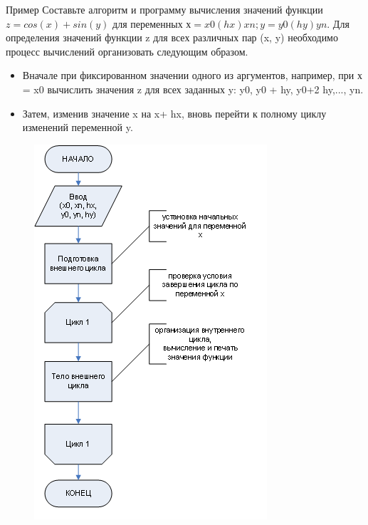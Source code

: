 \documentclass{beamer}
\begin{document}
\begin{frame}{Пример}
Составьте алгоритм и программу вычисления значений функции $z = cos(x) + sin(y)$ для переменных $х = x0 (hx) xn; y = y0 (hy) yn$.
Для определения значений функции z для всех различных пар (x, y) необходимо процесс вычислений организовать следующим образом. 
\begin{itemize}
\item Вначале при фиксированном значении одного из аргументов, например, при х = x0 вычислить значения z для всех заданных y:  y0, y0 + hy, y0+2 hy,..., yn. 
\item Затем, изменив значение x на x+ hx, вновь перейти к полному циклу изменений переменной y.
\end{itemize}
\end{frame}

\begin{frame}[fragile]
\begin{figure}[h]
\includegraphics[scale=0.6]{images/lec04-pic12.png}
\end{figure}
\end{frame}
\end{document}
